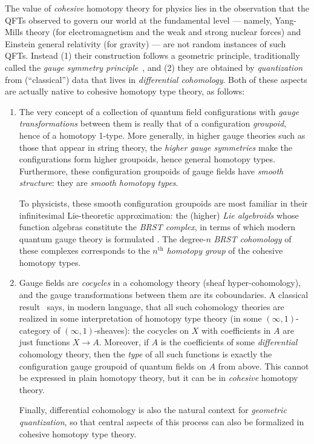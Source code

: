 \documentclass[copyright]{eptcs}
\begin{document}
The value of \emph{cohesive} homotopy theory for physics lies in the observation that
the QFTs observed to
govern our world at the fundamental level --- namely,
Yang-Mills theory (for electromagnetism and the weak and strong nuclear forces)
and Einstein general relativity (for gravity) --- are not random
instances of such QFTs.
Instead
(1) their construction follows a geometric principle,
traditionally called the \emph{gauge symmetry principle}~\cite{RS},
and (2) they are obtained by \emph{quantization} from
(``classical'') data that lives in \emph{differential cohomology}.
Both of these aspects are actually native to cohesive homotopy type theory, as follows:
\begin{enumerate}[leftmargin=*]
\item The very concept of a collection of quantum field configurations
with \emph{gauge transformations} between them
is really that of a configuration \emph{groupoid}, hence of a homotopy 1-type.
More generally, in higher gauge theories such as those that appear in string theory, the
\emph{higher gauge symmetries} make the configurations form higher groupoids, hence general
homotopy types.
Furthermore,  these configuration groupoids of gauge fields have
\emph{smooth structure}: they are \emph{smooth homotopy types}.

To physicists, these smooth configuration groupoids
are most familiar in their infinitesimal Lie-theoretic
approximation: the (higher) \emph{Lie algebroids} whose function algebras
constitute the \emph{BRST complex}, in terms of which modern quantum gauge theory is
formulated \cite{HT}. The degree-$n$
\emph{BRST cohomology} of these complexes
corresponds to the $n^{\mathrm{th}}$ \emph{homotopy group} of the cohesive homotopy types.
\item Gauge fields are \emph{cocycles} in a cohomology theory
(sheaf hyper-cohomology), and the
gauge transformations
between them are its %
coboundaries.
A classical result~\cite{Brown} says, in modern language,
that all such cohomology theories are realized in some interpretation of
homotopy type theory (in some $(\infty,1)$-category of $(\infty,1)$-sheaves):
the cocycles on $X$ with coefficients in $A$ are just functions $X \to A$.
Moreover, if $A$ is the coefficients of some \emph{differential} cohomology theory, then the \emph{type} of all such functions is exactly the configuration gauge groupoid of quantum fields on $A$ from above.
This cannot be expressed in plain homotopy theory, but it can be in \emph{cohesive} homotopy theory.

Finally, differential cohomology is also the natural context for
\emph{geometric quantization}, so that central aspects of this process can also be formalized in
cohesive homotopy type theory.
\end{enumerate}
\end{document}
